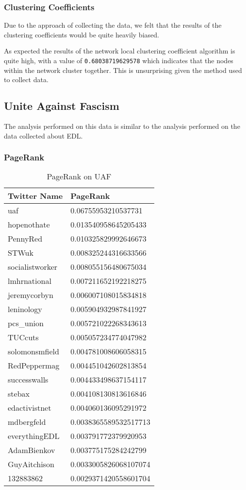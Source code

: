 \subsubsection{Clustering Coefficients}
Due to the approach of collecting the data, we felt that the results of the clustering coefficients would be quite heavily biased. 

As expected the results of the network local clustering coefficient algorithm is quite high, with a value of \verb/0.68038719629578/ which indicates that the nodes within the network cluster together. This is unsurprising given the method used to collect data.

\subsection{Unite Against Fascism}
The analysis performed on this data is similar to the analysis performed on the data collected about EDL. 

\subsubsection{PageRank}

\begin{table}%
\centering
\begin{tabular}{|l|l|}
\hline
Twitter Name & PageRank \\
\hline
uaf & 0.06755953210537731 \\
hopenothate & 0.013540958645205433 \\
PennyRed & 0.010325829992646673 \\
STWuk & 0.008325244316633566 \\
socialistworker & 0.008055156480675034 \\
lmhrnational & 0.007211652192218275 \\
jeremycorbyn & 0.006007108015834818 \\
leninology & 0.005904932987841927 \\
pcs\_union & 0.005721022268343613 \\
TUCcuts & 0.005057234774047982 \\
solomonsmfield & 0.004781008606058315 \\
RedPeppermag & 0.004451042602813854 \\
successwalls & 0.004433498637154117 \\
stebax & 0.004108130813616846 \\
edactivistnet & 0.004060136095291972 \\
mdbergfeld & 0.0038365589532517713 \\
everythingEDL & 0.003791772379920953 \\
AdamBienkov & 0.003775175284242799 \\
GuyAitchison & 0.0033005826068107074 \\
132883862 & 0.0029371420558601704 \\
\hline
\end{tabular}
\caption{PageRank on UAF}
\label{tab:uafpagerank}
\end{table}


